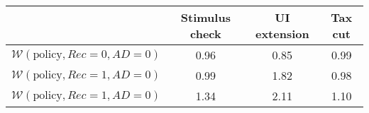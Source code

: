 \begin{tabular}{@{}lccc@{}} 
\toprule 
                          & Stimulus check      & UI extension    & Tax cut    \\  \midrule 
$\mathcal{W}(\text{policy}, Rec=0, AD=0)$ & 0.96  & 0.85  & 0.99     \\ 
$\mathcal{W}(\text{policy}, Rec=1, AD=0)$ & 0.99  & 1.82  & 0.98     \\ 
$\mathcal{W}(\text{policy}, Rec=1, AD=0)$ & 1.34  & 2.11  & 1.10     \\ 
\end{tabular}  
